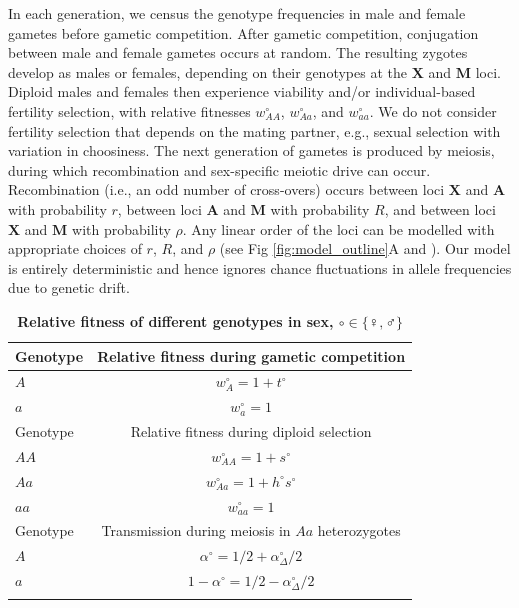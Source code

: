 \documentclass[10pt,letterpaper]{article}
\begin{document}
In each generation, we census the genotype frequencies in male and female gametes before gametic competition. 
After gametic competition, conjugation between male and female gametes occurs at random.
The resulting zygotes develop as males or females, depending on their genotypes at the $\mathbf{X}$ and $\mathbf{M}$ loci. 
Diploid males and females then experience viability and/or individual-based fertility selection, with relative fitnesses $w_{AA}^{\circ}$, $w_{Aa}^{\circ}$, and $w_{aa}^{\circ}$. 
We do not consider fertility selection that depends on the mating partner, e.g., sexual selection with variation in choosiness. 
The next generation of gametes is produced by meiosis, during which recombination and sex-specific meiotic drive can occur. 
Recombination (i.e., an odd number of cross-overs) occurs between loci $\mathbf{X}$ and $\mathbf{A}$ with probability $r$, between loci $\mathbf{A}$ and $\mathbf{M}$ with probability $R$, and between loci $\mathbf{X}$ and $\mathbf{M}$ with probability $\rho$.
Any linear order of the loci can be modelled with appropriate choices of $r$, $R$, and $\rho$ (see Fig \ref{fig:model_outline}A and ). 
Our model is entirely deterministic and hence ignores chance fluctuations in allele frequencies due to genetic drift.

\begin{table}[ht]
\smallskip
\caption{{\bf Relative fitness of different genotypes in sex, $\circ \in \{\female,\male\}$ } }
\begin{tabular}{l c }
\hline\hline
  Genotype & Relative fitness during gametic competition \\ [0.5ex] \hline
  $A$ & $w_{A}^\circ = 1+t^\circ$ \\
  $a$ & $w_{a}^\circ = 1$ \\ [0.5ex] \hline
  Genotype & Relative fitness during diploid selection \\ [0.5ex] \hline
  $AA$ & $w_{AA}^\circ = 1+ s^\circ$ \\
  $Aa$ & $w_{Aa}^\circ = 1+h^\circ s^\circ$ \\
  $aa$ & $w_{aa}^\circ = 1$ \\ [0.5ex] \hline
  Genotype & Transmission during meiosis in $Aa$ heterozygotes \\ [0.5ex] \hline
  $A$ & $\alpha^\circ=1/2+\alpha_{\Delta}^{\circ}/2$ \\
  $a$ & $1-\alpha^\circ=1/2-\alpha_{\Delta}^{\circ}/2$ \\
  \hline \hline
  \label{tab:fitnesstable}
 \end{tabular}
\end{table}
\end{document}
